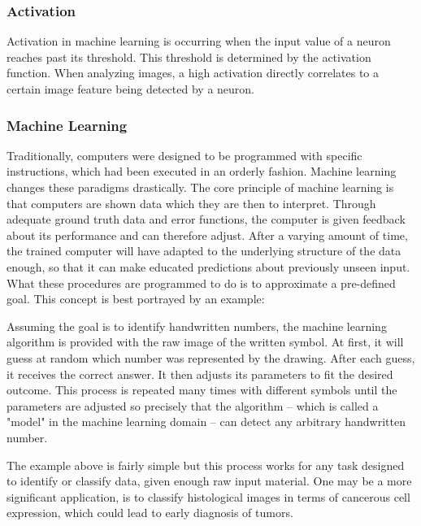 \documentclass{acmsiggraph}               %
\begin{document}
\subsubsection{Activation}
Activation in machine learning is occurring when the input value of a neuron reaches past its threshold. This threshold is determined by the activation function. When analyzing images, a high activation directly correlates to a certain image feature being detected by a neuron.

\subsubsection{Machine Learning}
Traditionally, computers were designed to be programmed with specific instructions, which had been executed in an orderly fashion.
Machine learning changes these paradigms drastically. The core principle of machine learning is that computers are shown data which they are then to interpret. Through adequate ground truth data and error functions, the computer is given feedback about its performance and can therefore adjust. After a varying amount of time, the trained computer will have adapted to the underlying structure of the data enough, so that it can make educated predictions about previously unseen input. What these procedures are programmed to do is to approximate a pre-defined goal. This concept is best portrayed by an example:

Assuming the goal is to identify handwritten numbers, the machine learning algorithm is provided with the raw image of the written symbol. At first, it will guess at random which number was represented by the drawing. 
After each guess, it receives the correct answer. It then adjusts its parameters to fit the desired outcome.
This process is repeated many times with different symbols until the parameters are adjusted so precisely that the algorithm -- which is called a "model" in the machine learning domain -- can detect any arbitrary handwritten number.

The example above is fairly simple but this process works for any task designed to identify or classify data, given enough raw input material. One may be a more significant application, is to classify histological images in terms of cancerous cell expression, which could lead to early diagnosis of tumors.
\end{document}
